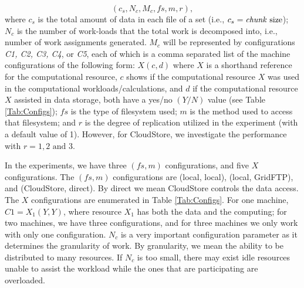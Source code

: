 \documentclass{rspublic}
\begin{document}
 \begin{equation}
(c_s, N_c, M_c, f\!s, m,r),
\label{Eq:tuple}
\end{equation}
where $c_s$ is the total amount of data in each file of a set (i.e.,
$c_s=\mbox{\textit{chunk} size}$); $N_c$ is the number of work-loads
that the total work is decomposed into, i.e., number of work assignments
generated. $M_c$ will be
represented by configurations \textit{C1, C2, C3, C4}, or \textit{C5}, each of
which is a comma separated list of the machine configurations of the
following form: $X(c, d)$ where $X$ is a shorthand reference for the
computational resource, $c$ shows if the computational resource $X$ was
used in the computational workloads/calculations, and $d$ if the
computational resource $X$ assisted in data storage, both have a yes/no
$(Y/N)$ value (see Table \ref{Tab:Configs}); $f\!s$ is the type of
filesystem used; $m$ is the method used to access that filesystem; and
$r$ is the degree of replication utilized in the experiment (with a
default value of 1). However, for CloudStore, we investigate the
performance with $r = 1, 2
\mbox{ and } 3$.

In the experiments, we have three $(f\!s, m)$ configurations, and five
$X$ configurations. The $(f\!s, m)$ configurations are (local, local),
(local, GridFTP), and (CloudStore, direct). By direct we mean CloudStore
controls the data access. The $X$ configurations are enumerated in Table
\ref{Tab:Configs}. For one machine, $\textit{C1}=X_1(Y,Y)$, where resource $X_1$
has both the data and the computing; for two machines, we have three
configurations, and for three machines we only work with only one
configuration. $N_c$ is a very important configuration parameter as it
determines the granularity of work. By granularity, we mean the ability
to be distributed to many resources. If $N_c$ is too small, there may
exist idle resources unable to assist the workload while the ones that
are participating are overloaded.
\end{document}
